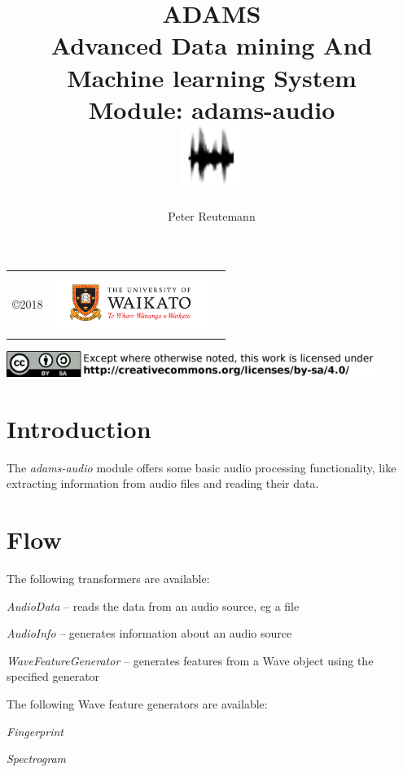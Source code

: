 \documentclass[a4paper]{book}
\title{
  \textbf{ADAMS} \\
  {\Large \textbf{A}dvanced \textbf{D}ata mining \textbf{A}nd \textbf{M}achine
  learning \textbf{S}ystem} \\
  {\Large Module: adams-audio} \\
  \vspace{1cm}
  \includegraphics[width=2cm]{images/audio-module.png} \\
}
\author{
  Peter Reutemann
}
\begin{document}
\begin{titlepage}
\maketitle

\thispagestyle{empty}
\center
\begin{table}[b]
	\begin{tabular}{c l l}
		\parbox[c][2cm]{2cm}{\copyright 2018} &
		\parbox[c][2cm]{5cm}{\includegraphics[width=5cm]{images/coat_of_arms.pdf}} \\
	\end{tabular}
	\includegraphics[width=12cm]{images/cc.png} \\
\end{table}

\end{titlepage}

\tableofcontents

\chapter{Introduction}
The \textit{adams-audio} module offers some basic audio processing functionality,
like extracting information from audio files and reading their data.

\chapter{Flow}
The following transformers are available:
\begin{tight_itemize}
  \item \textit{AudioData} -- reads the data from an audio source, eg a file
  \item \textit{AudioInfo} -- generates information about an audio source
  \item \textit{WaveFeatureGenerator} -- generates features from a Wave object
  using the specified generator
\end{tight_itemize}

\noindent The following Wave feature generators are available:
\begin{tight_itemize}
  \item \textit{Fingerprint}
  \item \textit{Spectrogram}
\end{tight_itemize}


\end{document}

